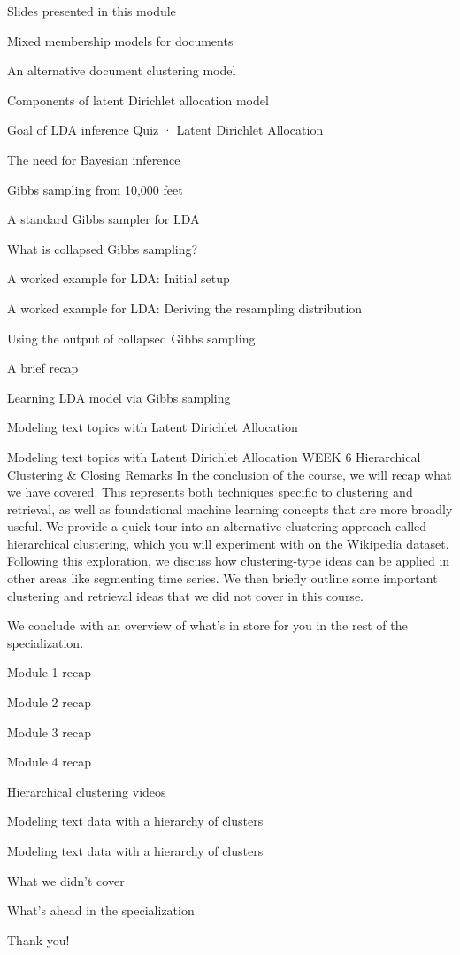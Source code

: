\item Slides presented in this module
\item Mixed membership models for documents
\item An alternative document clustering model
\item Components of latent Dirichlet allocation model
\item Goal of LDA inference
Quiz · Latent Dirichlet Allocation
\item The need for Bayesian inference
\item Gibbs sampling from 10,000 feet
\item A standard Gibbs sampler for LDA
\item What is collapsed Gibbs sampling?
\item A worked example for LDA: Initial setup
\item A worked example for LDA: Deriving the resampling distribution
\item Using the output of collapsed Gibbs sampling
\item A brief recap
\item Learning LDA model via Gibbs sampling
\item Modeling text topics with Latent Dirichlet Allocation
\item Modeling text topics with Latent Dirichlet Allocation
WEEK 6
Hierarchical Clustering & Closing Remarks
In the conclusion of the course, we will recap what we have covered. This represents both techniques specific to clustering and retrieval, as well as foundational machine learning concepts that are more broadly useful.
We provide a quick tour into an alternative clustering approach called hierarchical clustering, which you will experiment with on the Wikipedia dataset. Following this exploration, we discuss how clustering-type ideas can be applied in other areas like segmenting time series. We then briefly outline some important clustering and retrieval ideas that we did not cover in this course.

We conclude with an overview of what's in store for you in the rest of the specialization.

\item Module 1 recap
\item Module 2 recap
\item Module 3 recap
\item Module 4 recap
\item Hierarchical clustering videos
\item Modeling text data with a hierarchy of clusters
\item Modeling text data with a hierarchy of clusters
\item What we didn't cover
\item What's ahead in the specialization
\item Thank you!

